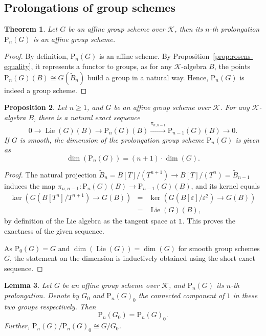 \documentclass[10pt,a4paper]{amsart}
\theoremstyle{plain} %
\newtheorem{Theorem}{Theorem}[section]
\newtheorem{Lemma}[Theorem]{Lemma}
\newtheorem{Proposition}[Theorem]{Proposition}
\theoremstyle{definition}
\theoremstyle{remark}
\newcommand{\cK}{\mathcal{K}}   %
\newcommand{\rP}[1]{\mathrm{P}_{\!#1}}
\newcommand{\Ker}{\operatorname{ker}}
\newcommand{\one}{\mathds{1}}
\newcommand{\Lie}{\operatorname{Lie}}
\numberwithin{equation}{subsection}
\begin{document}
\subsection{Prolongations of group schemes}


\begin{Theorem}	
		Let $G$ be an affine group scheme over $\cK$, then its $n$-th prolongation $\rP{n}(G)$ is an affine group scheme.
\end{Theorem}

\begin{proof}
	By definition, $\rP{n}(G)$ is an affine scheme. By Proposition~\ref{prop:rosens-equality}, it represents a functor to groups, as for any $\cK$-algebra $B$, the points $\rP{n}(G)(B)\cong G(\tilde{B}_n)$ build a group in a natural way. Hence, $\rP{n}(G)$ is indeed a group scheme.
\end{proof}

\begin{Proposition}\label{prop:ses-and-dim-of-prolongations}
	Let $n\geq 1$, and $G$ be an affine group scheme over $\cK$. For any $\cK$-algebra $B$, there is a natural exact sequence 
	\begin{equation}\label{eq:ses-of-prolongations}
	 0 \to \Lie(G)(B)\to 
\rP{n}(G)(B) \xrightarrow{\pi_{n,n-1}} 
\rP{n-1}(G)(B) \to 0.
\end{equation}	 
	If $G$ is smooth, the dimension of the prolongation group scheme $\rP{n}(G)$ is given as
	\[ \dim(\rP{n}(G))=(n+1)\cdot \dim(G).\]
\end{Proposition}
	
\begin{proof}
	The natural projection $\tilde{B}_n=B[T]/(T^{n+1}) \to B[T]/(T^{n})=\tilde{B}_{n-1}$ induces the map
	$\pi_{n,n-1}:\rP{n}(G)(B) \to 
\rP{n-1}(G)(B)$, and its kernel equals
	\begin{eqnarray*}
		\Ker\left(G(B[T^{n}]/T^{n+1})\to G(B)\right)&=&\Ker\left(G(B[\varepsilon]/\varepsilon^2)\to G(B)\right)\\
		&=& \Lie(G)(B),
	\end{eqnarray*}
	by definition of the Lie algebra as the tangent space at $\one$. This proves the exactness of the given sequence.
		
	As $\rP{0}(G)=G$ and $\dim (\Lie(G))=\dim (G)$ for smooth group schemes $G$, the statement on the dimension is inductively obtained using the short exact sequence.
\end{proof}

 
\begin{Lemma}\label{lem:connected-component}
Let $G$ be an affine group scheme over $\cK$, and $\rP{n}(G)$ its $n$-th prolongation.
Denote by $G_0$ and $\rP{n}(G)_0$ the connected component of $1$ in these two groups respectively.
Then \[ \rP{n}(G_0)=\rP{n}(G)_0.\]
Further, $\rP{n}(G)/\rP{n}(G)_0\cong G/G_0$.
\end{Lemma}
\end{document}
